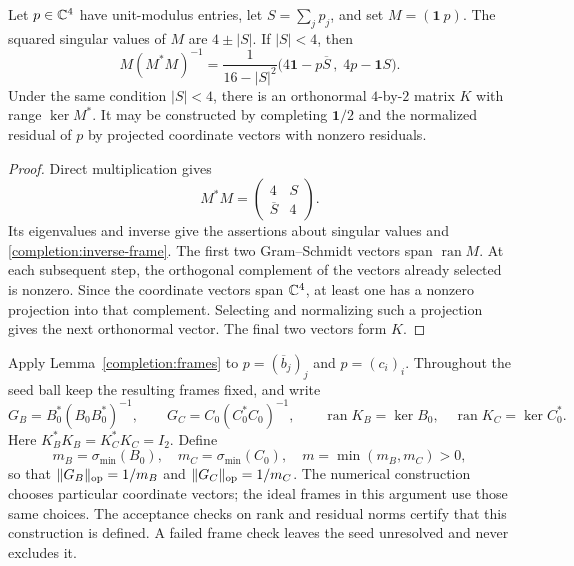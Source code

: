 \begin{lemma}
\label{completion:frames}
Let $p\in\mathbb C^4$ have unit-modulus entries, let
$S=\sum_j p_j$, and set $M=(\mathbf 1\ p)$.  The squared singular values
of $M$ are $4\pm |S|$.  If $|S|<4$, then
\begin{equation}
\label{completion:inverse-frame}
 M(M^*M)^{-1}
 =\frac1{16-|S|^2}
 \big(4\mathbf 1-p\overline S\,,\;4p-\mathbf 1 S\big).
\end{equation}
Under the same condition $|S|<4$, there is an orthonormal $4$-by-$2$
matrix $K$ with range $\ker M^*$.
It may be constructed by completing $\mathbf 1/2$ and the normalized
residual of $p$ by projected coordinate vectors with nonzero residuals.
\end{lemma}

\begin{proof}
Direct multiplication gives
\[
 M^*M=\begin{pmatrix}4&S\\\overline S&4\end{pmatrix}.
\]
Its eigenvalues and inverse give the assertions about singular values and
\eqref{completion:inverse-frame}.  The first two Gram--Schmidt vectors
span $\operatorname{ran}M$.  At each subsequent step, the orthogonal
complement of the vectors already selected is nonzero.  Since the coordinate
vectors span $\mathbb C^4$, at least one has a nonzero projection into that
complement.  Selecting and normalizing such a projection gives the next
orthonormal vector.  The final two vectors form $K$.
\end{proof}

Apply Lemma~\ref{completion:frames} to $p=(\overline b_j)_j$ and
$p=(c_i)_i$.  Throughout the seed ball keep the resulting frames fixed, and
write
\begin{equation}
\label{completion:frame-definitions}
 G_B=B_0^*(B_0B_0^*)^{-1},\qquad
 G_C=C_0(C_0^*C_0)^{-1},\qquad
 \operatorname{ran}K_B=\ker B_0,\quad
 \operatorname{ran}K_C=\ker C_0^*.
\end{equation}
Here $K_B^*K_B=K_C^*K_C=I_2$.  Define
\[
 m_B=\sigma_{\min}(B_0),\quad
 m_C=\sigma_{\min}(C_0),\quad
 m=\min(m_B,m_C)>0,
\]
so that $\lVert G_B\rVert_{\rm op}=1/m_B$ and
$\lVert G_C\rVert_{\rm op}=1/m_C$.
The numerical construction chooses particular coordinate vectors; the ideal
frames in this argument use those same choices.  The acceptance checks on
rank and residual norms certify that this construction is defined.  A
failed frame check leaves the seed unresolved and never excludes it.

